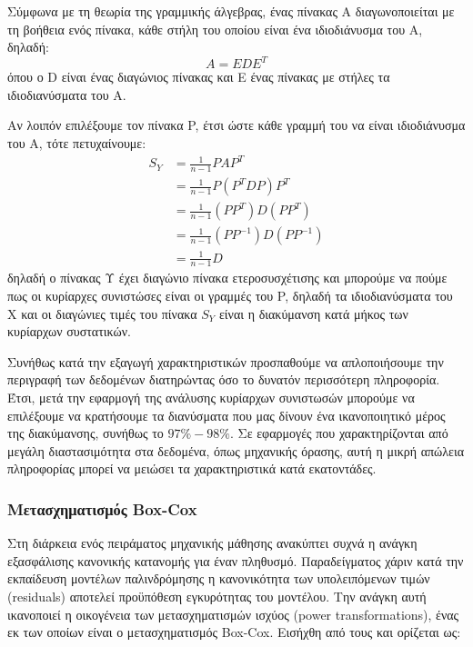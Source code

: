 Σύμφωνα με τη θεωρία της γραμμικής άλγεβρας, ένας πίνακας Α διαγωνοποιείται  με τη βοήθεια ενός πίνακα, κάθε στήλη του οποίου είναι ένα ιδιοδιάνυσμα του Α, δηλαδή:
\begin{equation} 
A=EDE^T
\end{equation} 
όπου ο D είναι ένας διαγώνιος πίνακας και Ε ένας πίνακας με στήλες τα ιδιοδιανύσματα του Α. 

Αν λοιπόν επιλέξουμε τον πίνακα P, έτσι ώστε κάθε γραμμή του να είναι ιδιοδιάνυσμα του A, τότε πετυχαίνουμε:
\begin{equation} 
\begin{split}
S_Y & = \frac{1}{n-1} PAP^T \\
& = \frac{1}{n-1} P(P^TDP)P^T \\
& = \frac{1}{n-1} (PP^T)D(PP^T)\\
& = \frac{1}{n-1}(PP^{-1})D(PP^{-1})\\
& = \frac{1}{n-1} D
\end{split}
\end{equation} 
δηλαδή ο πίνακας Υ έχει διαγώνιο πίνακα ετεροσυσχέτισης και μπορούμε να πούμε πως οι κυρίαρχες συνιστώσες είναι οι γραμμές του P, δηλαδή τα ιδιοδιανύσματα του X και οι διαγώνιες τιμές του πίνακα $S_Y$ είναι η διακύμανση κατά μήκος των κυρίαρχων συστατικών.

Συνήθως κατά την εξαγωγή χαρακτηριστικών προσπαθούμε να απλοποιήσουμε την περιγραφή των δεδομένων διατηρώντας όσο το δυνατόν περισσότερη πληροφορία. Έτσι, μετά την εφαρμογή της ανάλυσης κυρίαρχων συνιστωσών μπορούμε να επιλέξουμε να κρατήσουμε τα διανύσματα που μας δίνουν ένα ικανοποιητικό μέρος της διακύμανσης, συνήθως το $ 97\% -98\% $. Σε εφαρμογές που χαρακτηρίζονται από μεγάλη διαστασιμότητα στα δεδομένα, όπως μηχανικής όρασης, αυτή η μικρή απώλεια πληροφορίας μπορεί να μειώσει τα χαρακτηριστικά κατά εκατοντάδες.

\subsubsection{Μετασχηματισμός Box-Cox}
Στη διάρκεια ενός πειράματος μηχανικής μάθησης ανακύπτει συχνά η ανάγκη εξασφάλισης κανονικής κατανομής για έναν πληθυσμό. Παραδείγματος χάριν κατά την εκπαίδευση μοντέλων παλινδρόμησης η κανονικότητα των υπολειπόμενων τιμών (residuals) αποτελεί προϋπόθεση εγκυρότητας του μοντέλου. Την ανάγκη αυτή ικανοποιεί η οικογένεια των μετασχηματισμών ισχύος (power transformations), ένας εκ των οποίων είναι ο μετασχηματισμός Box-Cox. Εισήχθη από τους \citet{10.2307/2984418} και ορίζεται ως:

